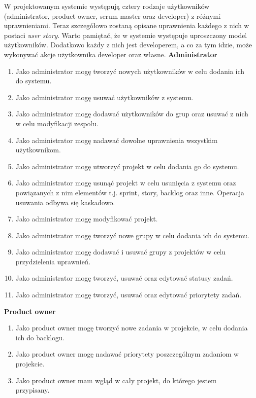 \documentclass[a4paper,11pt]{article}
\begin{document}
W projektowanym systemie występują cztery rodzaje użytkowników (administrator, product owner, scrum master oraz developer) z różnymi uprawnieniami. Teraz szczegółowo zostaną opisane uprawnienia każdego z nich w postaci \textit{user story}. Warto pamiętać, że w systemie występuje uproszczony model użytkowników. Dodatkowo każdy z nich jest developerem, a co za tym idzie, może wykonywać akcje użytkownika developer oraz własne.
	\newline
	\newline
	\textbf{Administrator}
	\begin{enumerate}	
		\item Jako administrator mogę tworzyć nowych użytkowników w celu dodania ich do systemu.
		\item Jako administrator mogę usuwać użytkowników z systemu.
		\item Jako administrator mogę dodawać użytkowników do grup oraz usuwać z nich w celu modyfikacji zespołu.
		\item Jako administrator mogę nadawać dowolne uprawnienia wszystkim użytkownikom.		
		\item Jako administrator mogę utworzyć projekt w celu dodania go do systemu.
		\item Jako administrator mogę usunąć projekt w celu usunięcia z systemu oraz powiązanych z nim elementów t.j. sprint, story, backlog oraz inne. Operacja usuwania odbywa się kaskadowo.
		\item Jako administrator mogę modyfikować projekt.		
		\item Jako administrator mogę tworzyć nowe grupy w celu dodania ich do systemu.		
		\item Jako administrator mogę dodawać i usuwać grupy z projektów w celu przydzielenia uprawnień.
		\item Jako administrator mogę tworzyć, usuwać oraz edytować statusy zadań.
		\item Jako administrator mogę tworzyć, usuwać oraz edytować priorytety zadań.
	\end{enumerate}		
	\textbf{Product owner}
	\begin{enumerate}		
		\item Jako product owner mogę tworzyć nowe zadania w projekcie, w celu dodania ich do backlogu.
		\item Jako product owner mogę nadawać priorytety poszczególnym zadaniom w projekcie.
		\item Jako product owner mam wgląd w cały projekt, do którego jestem przypisany.
	\end{enumerate}	
\end{document}
